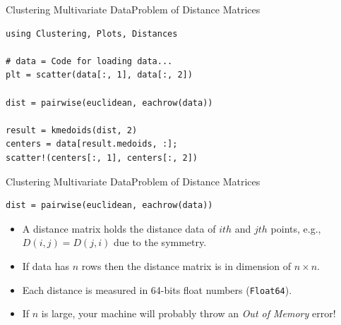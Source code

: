 \documentclass[11pt]{beamer}
\begin{document}
\begin{frame}[fragile]{Clustering Multivariate Data}{Problem of Distance Matrices}
\begin{lstlisting}
using Clustering, Plots, Distances

# data = Code for loading data...
plt = scatter(data[:, 1], data[:, 2])

dist = pairwise(euclidean, eachrow(data))

result = kmedoids(dist, 2)
centers = data[result.medoids, :];
scatter!(centers[:, 1], centers[:, 2])
\end{lstlisting}
\end{frame}


\begin{frame}[fragile]{Clustering Multivariate Data}{Problem of Distance Matrices}
\begin{lstlisting}
dist = pairwise(euclidean, eachrow(data))
\end{lstlisting}
\begin{itemize}
	\item A distance matrix holds the distance data of $ith$ and $jth$ points, e.g., $D(i, j) = D(j, i)$ due to the symmetry.
	\item If data has $n$ rows then the distance matrix is in dimension of $n \times n$. 
	\item Each distance is measured in 64-bits float numbers (\texttt{Float64}).
	\item If $n$ is large, your machine will probably throw an \emph{Out of Memory} error!
\end{itemize}
\end{frame}
\end{document}
